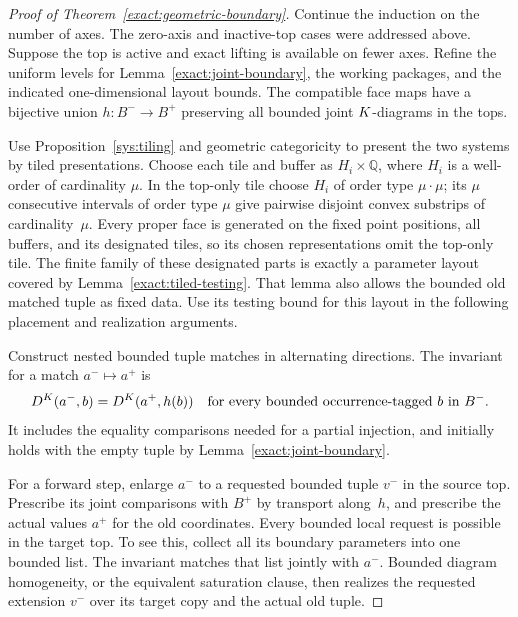 \begin{proof}[Proof of Theorem~\ref{exact:geometric-boundary}]
Continue the induction on the number of axes.  The zero-axis and
inactive-top cases were addressed above.  Suppose the top is active
and exact lifting is available on fewer axes.  Refine the uniform
levels for Lemma~\ref{exact:joint-boundary}, the working packages,
and the indicated one-dimensional layout bounds.  The compatible
face maps have a bijective union $h:B^-\to B^+$ preserving all
bounded joint $K$-diagrams in the tops.

Use Proposition~\ref{sys:tiling} and geometric categoricity to present
the two systems by tiled presentations.  Choose each tile and buffer
as $H_i\times\mathbb Q$, where $H_i$ is a well-order of cardinality
$\mu$.  In the top-only tile choose $H_i$ of order type
$\mu\cdot\mu$; its $\mu$ consecutive intervals of order type
$\mu$ give pairwise disjoint convex substrips of cardinality~$\mu$.
Every proper face is generated on the fixed point positions, all
buffers, and its designated tiles, so its chosen representations
omit the top-only tile.  The finite family of these designated parts
is exactly a parameter layout covered by
Lemma~\ref{exact:tiled-testing}.  That lemma also allows the bounded
old matched tuple as fixed data.  Use its testing bound for this
layout in the following placement and realization arguments.

Construct nested bounded tuple matches in alternating directions.
The invariant for a match $a^-\mapsto a^+$ is
\begin{equation}
 D^{K}(a^-,b)=D^{K}(a^+,h(b))
 \quad\text{for every bounded occurrence-tagged }b\text{ in }B^-.
 \label{exact:back-forth-invariant}
\end{equation}
It includes the equality comparisons needed for a partial
injection, and initially holds with the empty tuple by
Lemma~\ref{exact:joint-boundary}.

For a forward step, enlarge $a^-$ to a requested bounded tuple
$v^-$ in the source top.  Prescribe its joint comparisons with
$B^+$ by transport along~$h$, and prescribe the actual values
$a^+$ for the old coordinates.  Every bounded local request is
possible in the target top.  To see this, collect all its boundary
parameters into one bounded list.  The invariant matches that
list jointly with $a^-$.  Bounded diagram homogeneity, or the
equivalent saturation clause, then realizes the requested
extension $v^-$ over its target copy and the actual old tuple.


\end{proof}
